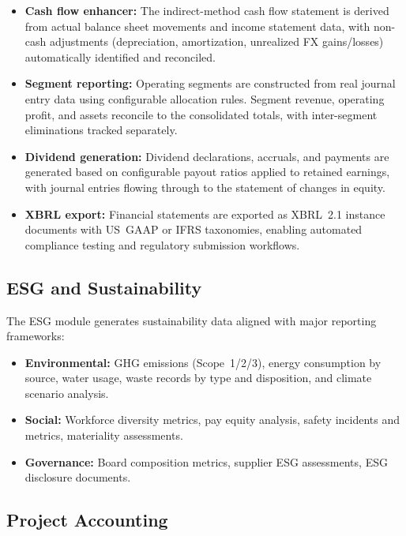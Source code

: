\begin{itemize}
  \item \textbf{Cash flow enhancer:} The indirect-method cash flow
    statement is derived from actual balance sheet movements and income
    statement data, with non-cash adjustments (depreciation,
    amortization, unrealized FX gains/losses) automatically identified
    and reconciled.
  \item \textbf{Segment reporting:} Operating segments are constructed
    from real journal entry data using configurable allocation rules.
    Segment revenue, operating profit, and assets reconcile to the
    consolidated totals, with inter-segment eliminations tracked
    separately.
  \item \textbf{Dividend generation:} Dividend declarations, accruals,
    and payments are generated based on configurable payout ratios
    applied to retained earnings, with journal entries flowing through
    to the statement of changes in equity.
  \item \textbf{XBRL export:} Financial statements are exported as
    XBRL~2.1 instance documents with US~GAAP or IFRS taxonomies,
    enabling automated compliance testing and regulatory submission
    workflows.
\end{itemize}

\subsection{ESG and Sustainability}
\label{sec:gen_esg}

The ESG module generates sustainability data aligned with major
reporting frameworks:

\begin{itemize}
  \item \textbf{Environmental:} GHG emissions (Scope~1/2/3), energy
    consumption by source, water usage, waste records by type and
    disposition, and climate scenario analysis.
  \item \textbf{Social:} Workforce diversity metrics, pay equity
    analysis, safety incidents and metrics, materiality assessments.
  \item \textbf{Governance:} Board composition metrics, supplier ESG
    assessments, ESG disclosure documents.
\end{itemize}

\subsection{Project Accounting}
\label{sec:gen_project}

